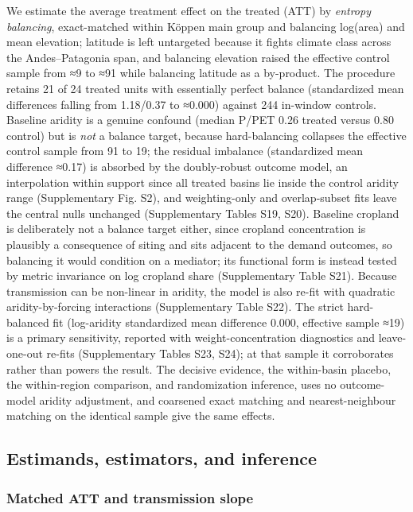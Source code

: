 \documentclass[
]{agujournal2019}
\begin{document}
We estimate the average treatment effect on the treated (ATT) by
\emph{entropy balancing}, exact-matched within Köppen main group and
balancing log(area) and mean elevation; latitude is left untargeted
because it fights climate class across the Andes--Patagonia span, and
balancing elevation raised the effective control sample from ≈9 to ≈91
while balancing latitude as a by-product. The procedure retains 21 of 24
treated units with essentially perfect balance (standardized mean
differences falling from 1.18/0.37 to ≈0.000) against 244 in-window
controls. Baseline aridity is a genuine confound (median P/PET 0.26
treated versus 0.80 control) but is \emph{not} a balance target, because
hard-balancing collapses the effective control sample from 91 to 19; the
residual imbalance (standardized mean difference ≈0.17) is absorbed by
the doubly-robust outcome model, an interpolation within support since
all treated basins lie inside the control aridity range (Supplementary
Fig. S2), and weighting-only and overlap-subset fits leave the central
nulls unchanged (Supplementary Tables S19, S20). Baseline cropland is
deliberately not a balance target either, since cropland concentration
is plausibly a consequence of siting and sits adjacent to the demand
outcomes, so balancing it would condition on a mediator; its functional
form is instead tested by metric invariance on log cropland share
(Supplementary Table S21). Because transmission can be non-linear in
aridity, the model is also re-fit with quadratic aridity-by-forcing
interactions (Supplementary Table S22). The strict hard-balanced fit
(log-aridity standardized mean difference 0.000, effective sample ≈19)
is a primary sensitivity, reported with weight-concentration diagnostics
and leave-one-out re-fits (Supplementary Tables S23, S24); at that
sample it corroborates rather than powers the result. The decisive
evidence, the within-basin placebo, the within-region comparison, and
randomization inference, uses no outcome-model aridity adjustment, and
coarsened exact matching and nearest-neighbour matching on the identical
sample give the same effects.

\subsection{Estimands, estimators, and
inference}\label{estimands-estimators-and-inference}

\subsubsection{Matched ATT and transmission
slope}\label{matched-att-and-transmission-slope}
\end{document}
